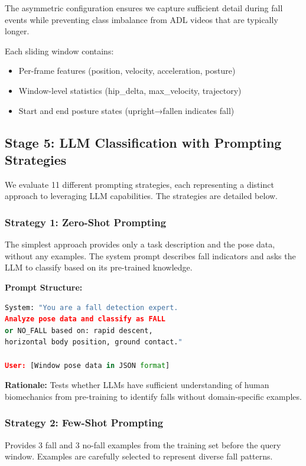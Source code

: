 \documentclass[conference]{IEEEtran}
\begin{document}
The asymmetric configuration ensures we capture sufficient detail during fall events while preventing class imbalance from ADL videos that are typically longer.

Each sliding window contains:
\begin{itemize}[leftmargin=*]
    \item Per-frame features (position, velocity, acceleration, posture)
    \item Window-level statistics (hip\_delta, max\_velocity, trajectory)
    \item Start and end posture states (upright→fallen indicates fall)
\end{itemize}

\subsection{Stage 5: LLM Classification with Prompting Strategies}

We evaluate 11 different prompting strategies, each representing a distinct approach to leveraging LLM capabilities. The strategies are detailed below.

\subsubsection{Strategy 1: Zero-Shot Prompting}
The simplest approach provides only a task description and the pose data, without any examples. The system prompt describes fall indicators and asks the LLM to classify based on its pre-trained knowledge.

\textbf{Prompt Structure:}
\begin{lstlisting}[language=Python]
System: "You are a fall detection expert. 
Analyze pose data and classify as FALL 
or NO_FALL based on: rapid descent, 
horizontal body position, ground contact."

User: [Window pose data in JSON format]
\end{lstlisting}

\textbf{Rationale:} Tests whether LLMs have sufficient understanding of human biomechanics from pre-training to identify falls without domain-specific examples.

\subsubsection{Strategy 2: Few-Shot Prompting}
Provides 3 fall and 3 no-fall examples from the training set before the query window. Examples are carefully selected to represent diverse fall patterns.
\end{document}
